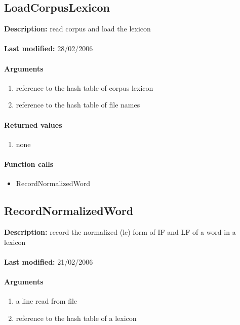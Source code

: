 \subsection{LoadCorpusLexicon}
\textbf{Description:} read corpus and load the lexicon\\
\\\textbf{Last modified:} 28/02/2006

\paragraph{Arguments}
\begin{enumerate}
\item reference to the hash table of corpus lexicon
\item reference to the hash table of file names
\end{enumerate}

\paragraph{Returned values}
\begin{enumerate}
\item none
\end{enumerate}

\paragraph{Function calls}
\begin{itemize}
\item RecordNormalizedWord
\end{itemize}

\subsection{RecordNormalizedWord}
\textbf{Description:} record the normalized (lc) form of IF and LF of a word in a lexicon\\
\\\textbf{Last modified:} 21/02/2006

\paragraph{Arguments}
\begin{enumerate}
\item a line read from file
\item reference to the hash table of a lexicon
\end{enumerate}

